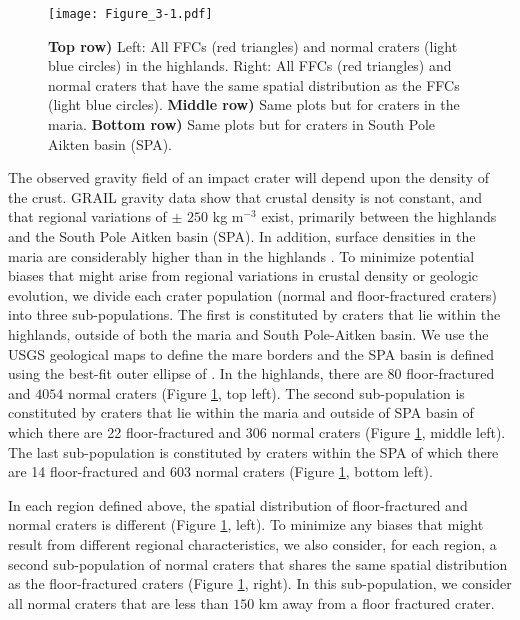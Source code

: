 \begin{figure}[pb]
    \graphicspath{ {/Users/thorey/Documents/These/Projet/FFC/Gravi_GRAIL/Article/Papier/Proof/} }
  \begin{center}

    \texttt{[image: Figure\_3-1.pdf]}
    \caption{\textbf{Top  row)} Left:  All  FFCs  (red triangles)  and
      normal craters (light blue circles) in the highlands. Right: All
      FFCs  (red triangles)  and  normal craters  that  have the  same
      spatial    distribution     as    the    FFCs     (light    blue
      circles). \textbf{Middle row)} Same plots but for craters in the
      maria.  \textbf{Bottom row)} Same plots but for craters in South
      Pole Aikten basin (SPA).}
    \label{Figure3-1}
  \end{center}
\end{figure}

The observed  gravity field of an  impact crater will depend  upon the
density of the crust. GRAIL gravity  data show that crustal density is
not constant, and that regional  variations of $\pm$ $250$ kg m$^{-3}$
exist, primarily between the highlands and the South Pole Aitken basin
(SPA). In  addition, surface densities  in the maria  are considerably
higher  than in  the highlands  \citep{Besserer:2014jr}.  To  minimize
potential biases that might arise  from regional variations in crustal
density or geologic evolution, we divide each crater population (normal
and floor-fractured craters) into three sub-populations.  The first is
constituted by craters that lie  within the highlands, outside of both
the maria  and South  Pole-Aitken basin.  We  use the  USGS geological
maps to define the mare borders and the SPA basin is defined using the
best-fit outer ellipse of \citet{GarrickBethell:2009dx}.
In the  highlands, there  are $80$  floor-fractured and  $4054$ normal
craters (Figure \ref{Figure3-1}, top  left).  The second sub-population
is constituted by craters that lie within the maria and outside of SPA basin
of which there  are 22 floor-fractured and 306  normal craters (Figure
\ref{Figure3-1}, middle left).  The  last sub-population is constituted
by craters  within the SPA of  which there are 14  floor-fractured and
603 normal craters (Figure \ref{Figure3-1}, bottom left).
	 
In   each  region   defined   above,  the   spatial  distribution   of
floor-fractured    and   normal    craters   is    different   (Figure
\ref{Figure3-1}, left).  To minimize any  biases that might result from
different regional characteristics, we also consider, for each region,
a second sub-population of normal craters that shares the same spatial
distribution  as the  floor-fractured  craters   (Figure  \ref{Figure3-1},
right).  In this  sub-population, we consider all  normal craters that
are less than $150$ km away from a floor fractured crater.

